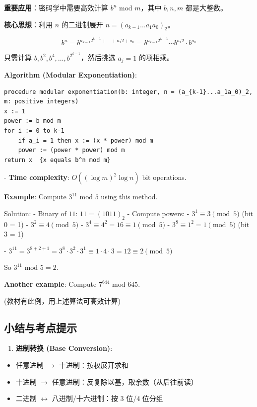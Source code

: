 \documentclass[10pt,a4paper,openany]{ctexbook}
\theoremstyle{definition}
\theoremstyle{remark}
\renewenvironment{quote}
  {\list{}{\leftmargin=1em\rightmargin=0pt\topsep=0.5pt\partopsep=0pt}\item[]}
  {\endlist}
\begin{document}
\begin{quote}
\textbf{重要应用}：密码学中需要高效计算 $b^n \text{ mod } m$，其中 $b, n, m$ 都是大整数。

\textbf{核心思想}：利用 $n$ 的二进制展开 $n = (a_{k-1}\dots a_1 a_0)_2$。

\[
b^n = b^{a_{k-1}2^{k-1} + \cdots + a_1 2 + a_0} = b^{a_{k-1}2^{k-1}} \cdots b^{a_1 2} \cdot b^{a_0}
\]


只需计算 $b, b^2, b^4, \dots, b^{2^{k-1}}$，然后挑选 $a_j = 1$ 的项相乘。

\textbf{Algorithm (Modular Exponentiation)}:
{\footnotesize\begin{verbatim}
procedure modular exponentiation(b: integer, n = (a_{k-1}...a_1a_0)_2, m: positive integers)
x := 1
power := b mod m
for i := 0 to k-1
    if a_i = 1 then x := (x * power) mod m
    power := (power * power) mod m
return x  {x equals b^n mod m}
\end{verbatim}}


- \textbf{Time complexity}: $O((\log m)^2 \log n)$ bit operations.

\textbf{Example}: Compute $3^{11} \text{ mod } 5$ using this method.

Solution:
- Binary of $11$: $11 = (1011)_2$
- Compute powers:
- $3^1 \equiv 3 \pmod{5}$ (bit 0 = 1)
- $3^2 \equiv 4 \pmod{5}$
- $3^4 \equiv 4^2 = 16 \equiv 1 \pmod{5}$
- $3^8 \equiv 1^2 = 1 \pmod{5}$ (bit 3 = 1)

- $3^{11} = 3^{8+2+1} = 3^8 \cdot 3^2 \cdot 3^1 \equiv 1 \cdot 4 \cdot 3 = 12 \equiv 2 \pmod{5}$

So $3^{11} \text{ mod } 5 = 2$.

\textbf{Another example}: Compute $7^{644} \text{ mod } 645$.

(教材有此例，用上述算法可高效计算)

\end{quote}
\vspace{-2pt}

\subsection{小结与考点提示}

\begin{enumerate}
\item \textbf{进制转换 (Base Conversion)}:
\end{enumerate}

\begin{itemize}
\item 任意进制 $\to$ 十进制：按权展开求和
\item 十进制 $\to$ 任意进制：反复除以基，取余数（从后往前读）
\item 二进制 $\leftrightarrow$ 八进制/十六进制：按 3 位/4 位分组

\end{itemize}
\end{document}
